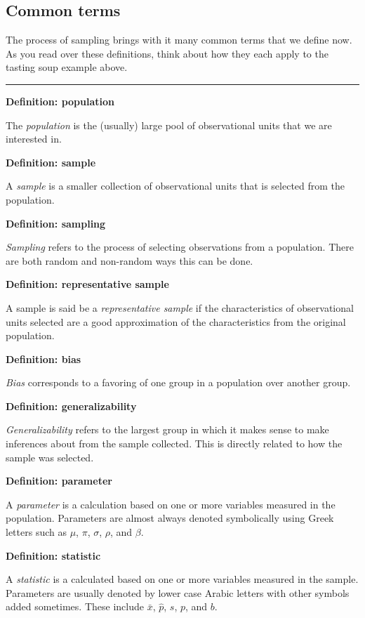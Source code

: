 \documentclass[]{tufte-book}
\let\oldrule=\rule
\renewcommand{\rule}[1]{\oldrule{\linewidth}}
\begin{document}
\subsection{Common terms}\label{common-terms}

The process of sampling brings with it many common terms that we define
now. As you read over these definitions, think about how they each apply
to the tasting soup example above.

\begin{center}\rule{0.5\linewidth}{\linethickness}\end{center}

\textbf{Definition: population}

The \emph{population} is the (usually) large pool of observational units
that we are interested in.

\textbf{Definition: sample}

A \emph{sample} is a smaller collection of observational units that is
selected from the population.

\textbf{Definition: sampling}

\emph{Sampling} refers to the process of selecting observations from a
population. There are both random and non-random ways this can be done.

\textbf{Definition: representative sample}

A sample is said be a \emph{representative sample} if the
characteristics of observational units selected are a good approximation
of the characteristics from the original population.

\textbf{Definition: bias}

\emph{Bias} corresponds to a favoring of one group in a population over
another group.

\textbf{Definition: generalizability}

\emph{Generalizability} refers to the largest group in which it makes
sense to make inferences about from the sample collected. This is
directly related to how the sample was selected.

\textbf{Definition: parameter}

A \emph{parameter} is a calculation based on one or more variables
measured in the population. Parameters are almost always denoted
symbolically using Greek letters such as \(\mu\), \(\pi\), \(\sigma\),
\(\rho\), and \(\beta\).

\textbf{Definition: statistic}

A \emph{statistic} is a calculated based on one or more variables
measured in the sample. Parameters are usually denoted by lower case
Arabic letters with other symbols added sometimes. These include
\(\bar{x}\), \(\hat{p}\), \(s\), \(p\), and \(b\).
\end{document}
